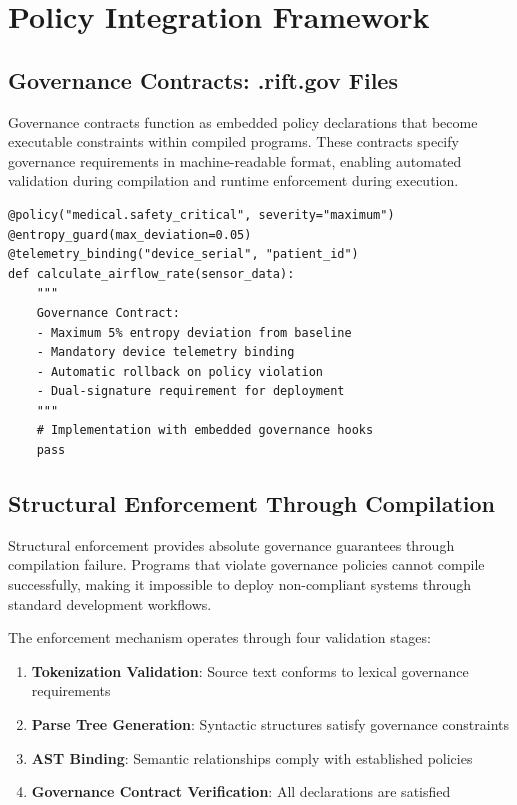 \section{Policy Integration Framework}

\subsection{Governance Contracts: .rift.gov Files}

Governance contracts function as embedded policy declarations that become executable constraints within compiled programs. These contracts specify governance requirements in machine-readable format, enabling automated validation during compilation and runtime enforcement during execution.

\begin{lstlisting}[style=riftlang, language=rift]
@policy("medical.safety_critical", severity="maximum")
@entropy_guard(max_deviation=0.05)
@telemetry_binding("device_serial", "patient_id")
def calculate_airflow_rate(sensor_data):
    """
    Governance Contract:
    - Maximum 5% entropy deviation from baseline
    - Mandatory device telemetry binding
    - Automatic rollback on policy violation
    - Dual-signature requirement for deployment
    """
    # Implementation with embedded governance hooks
    pass
\end{lstlisting}

\subsection{Structural Enforcement Through Compilation}

Structural enforcement provides absolute governance guarantees through compilation failure. Programs that violate governance policies cannot compile successfully, making it impossible to deploy non-compliant systems through standard development workflows.

The enforcement mechanism operates through four validation stages:

\begin{enumerate}
\item \textbf{Tokenization Validation}: Source text conforms to lexical governance requirements
\item \textbf{Parse Tree Generation}: Syntactic structures satisfy governance constraints
\item \textbf{AST Binding}: Semantic relationships comply with established policies
\item \textbf{Governance Contract Verification}: All  declarations are satisfied
\end{enumerate}

